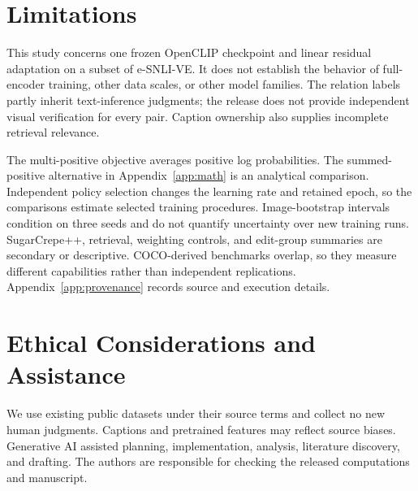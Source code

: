 \documentclass[11pt]{article}
\begin{document}
\clearpage
\section*{Limitations}
This study concerns one frozen OpenCLIP checkpoint and linear residual adaptation on a subset of e-SNLI-VE. It does not establish the behavior of full-encoder training, other data scales, or other model families. The relation labels partly inherit text-inference judgments; the release does not provide independent visual verification for every pair. Caption ownership also supplies incomplete retrieval relevance.

The multi-positive objective averages positive log probabilities. The summed-positive alternative in Appendix~\ref{app:math} is an analytical comparison. Independent policy selection changes the learning rate and retained epoch, so the comparisons estimate selected training procedures. Image-bootstrap intervals condition on three seeds and do not quantify uncertainty over new training runs. SugarCrepe++, retrieval, weighting controls, and edit-group summaries are secondary or descriptive. COCO-derived benchmarks overlap, so they measure different capabilities rather than independent replications. Appendix~\ref{app:provenance} records source and execution details.

\section*{Ethical Considerations and Assistance}
We use existing public datasets under their source terms and collect no new human judgments. Captions and pretrained features may reflect source biases. Generative AI assisted planning, implementation, analysis, literature discovery, and drafting. The authors are responsible for checking the released computations and manuscript.


\appendix


\end{document}
